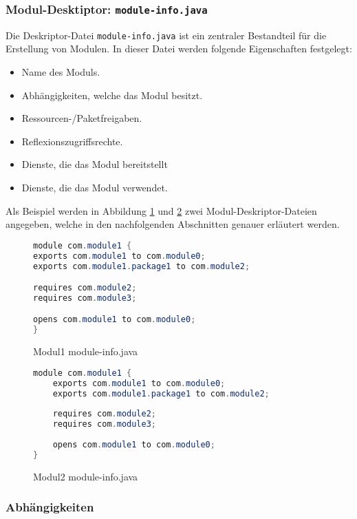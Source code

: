 \subsubsection{Modul-Desktiptor: \texttt{module-info.java}}
Die Deskriptor-Datei \texttt{module-info.java} ist ein zentraler Bestandteil für die Erstellung von Modulen.
In dieser Datei werden folgende Eigenschaften festgelegt:

\begin{itemize}[noitemsep]
	\item Name des Moduls.
	\item Abhängigkeiten, welche das Modul besitzt.
	\item Ressourcen-/Paketfreigaben.
	\item Reflexionszugriffsrechte.
	\item Dienste, die das Modul bereitstellt
	\item Dienste, die das Modul verwendet.
\end{itemize}

Als Beispiel werden in Abbildung \ref{fig:mod1-info} und \ref{fig:mod2-info} zwei Modul-Deskriptor-Dateien angegeben, welche in den nachfolgenden Abschnitten genauer erläutert werden.


\begin{figure}[h!]
\begin{lstlisting}[frame=none, language=java]
module com.module1 {
exports com.module1 to com.module0;
exports com.module1.package1 to com.module2;

requires com.module2;
requires com.module3;

opens com.module1 to com.module0;
}
\end{lstlisting}
\caption{Modul1 module-info.java}
\label{fig:mod1-info}
\end{figure}


\begin{figure}[h!]
\begin{lstlisting}[frame=none, language=java]
module com.module1 {
	exports com.module1 to com.module0;
	exports com.module1.package1 to com.module2;
	
	requires com.module2;
	requires com.module3;
	
	opens com.module1 to com.module0;
}
\end{lstlisting}
\caption{Modul2 module-info.java}
\label{fig:mod2-info}
\end{figure}


\subsubsection{Abhängigkeiten}

